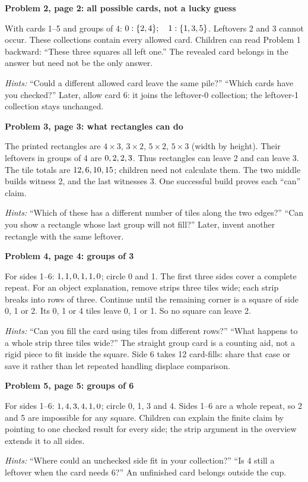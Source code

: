 \documentclass[11pt]{article}
\newcommand{\sub}[1]{\par\textbf{#1}\par}
\begin{document}
\sub{Problem 2, page 2: all possible cards, not a lucky guess}
With cards 1--5 and groups of 4: $0:\{2, 4\};\quad 1:\{1, 3, 5\}$. Leftovers 2 and 3 cannot occur. These collections contain every allowed card. Children can read Problem 1 backward: ``These three squares all left one.'' The revealed card belongs in the answer but need not be the only answer.

\textit{Hints:} ``Could a different allowed card leave the same pile?'' ``Which cards have you checked?'' Later, allow card 6: it joins the leftover-0 collection; the leftover-1 collection stays unchanged.

\sub{Problem 3, page 3: what rectangles can do}
The printed rectangles are $4\times3$, $3\times2$, $5\times2$, $5\times3$ (width by height). Their leftovers in groups of 4 are $0, 2, 2, 3$. Thus rectangles can leave 2 and can leave 3. The tile totals are $12, 6, 10, 15$; children need not calculate them. The two middle builds witness 2, and the last witnesses 3. One successful build proves each ``can'' claim.

\textit{Hints:} ``Which of these has a different number of tiles along the two edges?'' ``Can you show a rectangle whose last group will not fill?'' Later, invent another rectangle with the same leftover.

\sub{Problem 4, page 4: groups of 3}
For sides 1--6: $1, 1, 0, 1, 1, 0$; circle 0 and 1. The first three sides cover a complete repeat. For an object explanation, remove strips three tiles wide; each strip breaks into rows of three. Continue until the remaining corner is a square of side 0, 1 or 2. Its 0, 1 or 4 tiles leave 0, 1 or 1. So no square can leave 2.

\textit{Hints:} ``Can you fill the card using tiles from different rows?'' ``What happens to a whole strip three tiles wide?'' The straight group card is a counting aid, not a rigid piece to fit inside the square. Side 6 takes 12 card-fills: share that case or save it rather than let repeated handling displace comparison.

\sub{Problem 5, page 5: groups of 6}
For sides 1--6: $1, 4, 3, 4, 1, 0$; circle 0, 1, 3 and 4. Sides 1--6 are a whole repeat, so 2 and 5 are impossible for any square. Children can explain the finite claim by pointing to one checked result for every side; the strip argument in the overview extends it to all sides.

\textit{Hints:} ``Where could an unchecked side fit in your collection?'' ``Is 4 still a leftover when the card needs 6?'' An unfinished card belongs outside the cup.
\end{document}
